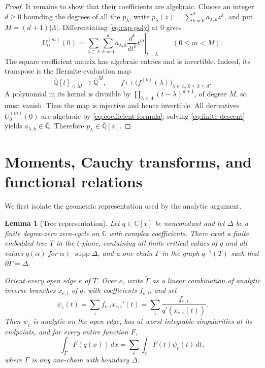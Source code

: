 \documentclass[11pt]{article}
\numberwithin{equation}{section}
\newtheorem{lemma}[lemma]{Lemma}
\theoremstyle{definition}
\theoremstyle{remark}
\newcommand{\C}{\mathbb C}
\newcommand{\Qbar}{\overline{\mathbb Q}}
\newcommand{\supp}{\operatorname{supp}}
\begin{document}
\begin{proof}
It remains to show that their coefficients are algebraic.  Choose an
integer $d\ge0$ bounding the degrees of all the $p_\lambda$, write
$p_\lambda(z)=\sum_{k=0}^d a_{\lambda,k}z^k$, and put
$M=(d+1)|\Lambda|$.  Differentiating \eqref{eq:exp-poly} at $0$ gives
\begin{equation}\label{eq:finite-descent}
  U_0^{(m)}(0)
  =\sum_{\lambda\in\Lambda}\sum_{k=0}^d
     a_{\lambda,k}
     \left.\frac{d^k}{dt^k}t^m\right|_{t=\lambda}
  \qquad(0\le m<M).
\end{equation}
The square coefficient matrix has algebraic entries and is invertible.
Indeed, its transpose is the Hermite evaluation map
\[
  \Qbar[t]_{<M}\longrightarrow\Qbar^M,
  \qquad f\longmapsto
  \bigl(f^{(k)}(\lambda)\bigr)_{\lambda\in\Lambda,\,0\le k\le d}.
\]
A polynomial in its kernel is divisible by
$\prod_{\lambda\in\Lambda}(t-\lambda)^{d+1}$, of degree $M$, so must
vanish.  Thus the map is injective and hence invertible.  All derivatives
$U_0^{(m)}(0)$ are algebraic by \eqref{eq:coefficient-formula}; solving
\eqref{eq:finite-descent} yields $a_{\lambda,k}\in\Qbar$.  Therefore
$p_\lambda\in\Qbar[z]$.
\end{proof}

\section{Moments, Cauchy transforms, and functional relations}

We first isolate the geometric representation used by the analytic
argument.

\begin{lemma}[Tree representation]\label{lem:tree-representation}
Let $q\in\C[x]$ be nonconstant and let $\Delta$ be a finite degree-zero
zero-cycle on $\C$ with complex coefficients.  There exist a finite
embedded tree $T$ in the $t$-plane, containing all finite critical values
of $q$ and all values $q(\alpha)$ for $\alpha\in\supp\Delta$, and a
one-chain $\widetilde\Gamma$ in the graph $q^{-1}(T)$ such that
$\partial\widetilde\Gamma=\Delta$.

Orient every open edge $e$ of $T$.  Over $e$, write
$\widetilde\Gamma$ as a linear combination of analytic inverse branches
$x_{e,i}$ of $q$, with coefficients $f_{e,i}$, and set
\begin{equation}\label{eq:edge-density}
  \psi_e(t)=\sum_i f_{e,i}x_{e,i}'(t)
  =\sum_i\frac{f_{e,i}}{q'(x_{e,i}(t))}.
\end{equation}
Then $\psi_e$ is analytic on the open edge, has at worst integrable
singularities at its endpoints, and for every entire function $F$,
\begin{equation}\label{eq:edge-decomposition}
  \int_\Gamma F(q(x))\,dx
  =\sum_e\int_e F(t)\psi_e(t)\,dt,
\end{equation}
where $\Gamma$ is any one-chain with boundary $\Delta$.
\end{lemma}
\end{document}
